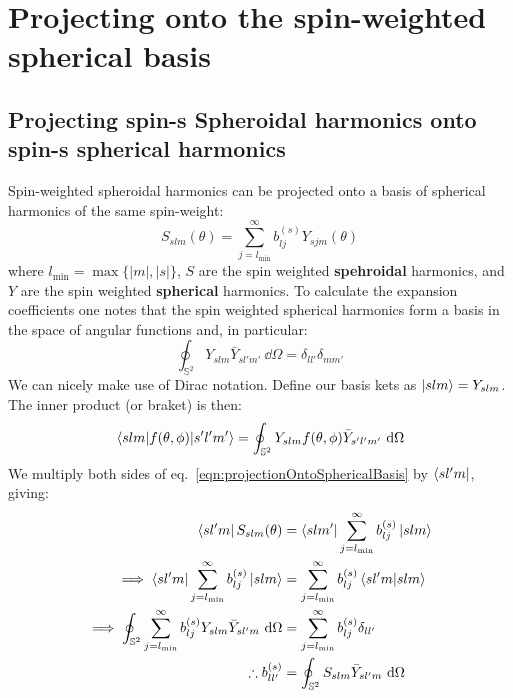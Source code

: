\documentclass[preprint,showpacs,preprintnumbers,amssymb,superscriptaddress,aps,prd,nofootinbib,11pt]{revtex4-1}
\begin{document}
\section{Projecting onto the spin-weighted spherical basis}
\label{appendix:Projection}
\subsection{Projecting spin-s Spheroidal harmonics onto spin-s spherical harmonics}
Spin-weighted spheroidal harmonics can be projected onto a basis of spherical harmonics of the same spin-weight:
\begin{equation}
    S_{slm}(\theta) = \sum\limits_{j=l_\text{min}}^{\infty} b_{lj}^{(s)} Y_{sjm} (\theta) \label{eqn:projectionOntoSphericalBasis}
\end{equation}
where $l_\text{min} = \max\{|m| ,|s|\}$, $S$ are the spin weighted \textbf{spehroidal} harmonics, and $Y$  are the spin weighted \textbf{spherical} harmonics. To calculate the expansion coefficients one notes that the spin weighted spherical harmonics form a basis in the space of angular functions and, in particular:
\begin{equation}
    \oint_{\mathbb{S}^2} Y_{slm}  \bar{Y}_{s l'  m'} \ \dd \Omega = \delta_{l l'} \delta_{m m'}
\end{equation}
We can nicely make use of Dirac notation. Define our basis kets as $\ket{slm} = Y_{slm}$. The inner product (or braket) is then:
\begin{equation}
    \mel{slm}{f(\theta,\phi)}{s'l'm'}= \oint_{\mathbb{S}^2} Y_{slm} f(\theta,\phi)  \bar{Y}_{s' l'  m'}\  \dd \Omega
\end{equation}
We multiply both sides of eq.~\eqref{eqn:projectionOntoSphericalBasis} by $\bra{sl'm}$, giving:
\begin{align}
    \bra{sl'm} S_{slm}(\theta) &= \bra{slm'}\sum\limits_{j=l_\text{min}}^{\infty} b_{lj}^{(s)} \ket{slm} \\
    \implies \bra{sl'm}\sum\limits_{j=l_\text{min}}^{\infty} b_{lj}^{(s)} \ket{slm} &=\sum\limits_{j=l_\text{min}}^{\infty} b_{lj}^{(s)} \braket{sl'm}{slm}\\
    \implies \oint_{\mathbb{S}^2}  \sum\limits_{j=l_\text{min}}^{\infty} b_{lj}^{(s)} Y_{slm} \bar{Y}_{s l'm} \ \dd \Omega &= \sum\limits_{j=l_\text{min}}^{\infty} b_{lj}^{(s)} \delta_{ll'}\\
    \therefore b_{ll'}^{(s)} &= \oint_{\mathbb{S}^2} S_{slm} \bar{Y}_{sl'm} \ \dd \Omega 
\end{align}
\end{document}
